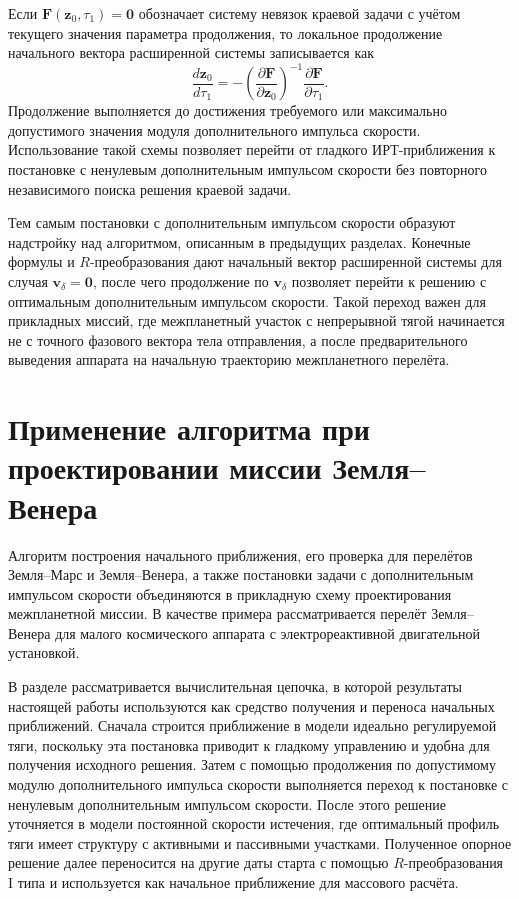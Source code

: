 Если \(\mathbf F(\mathbf z_0,\tau_1)=\mathbf 0\) обозначает систему невязок краевой задачи с учётом текущего значения параметра продолжения, то локальное продолжение начального вектора расширенной системы записывается как
\begin{equation}
	\frac{d\mathbf z_0}{d\tau_1}
	=
	-
	\left(
	\frac{\partial \mathbf F}{\partial \mathbf z_0}
	\right)^{-1}
	\frac{\partial \mathbf F}{\partial \tau_1}.
	\label{eq:ch4_vdelta_continuation_z0}
\end{equation}
Продолжение выполняется до достижения требуемого или максимально допустимого значения модуля дополнительного импульса скорости. Использование такой схемы позволяет перейти от гладкого ИРТ-приближения к постановке с ненулевым дополнительным импульсом скорости без повторного независимого поиска решения краевой задачи.

Тем самым постановки с дополнительным импульсом скорости образуют надстройку над алгоритмом, описанным в предыдущих разделах. Конечные формулы и \(R\)-преобразования дают начальный вектор расширенной системы для случая \(\mathbf v_\delta=\mathbf 0\), после чего продолжение по \(\mathbf v_\delta\) позволяет перейти к решению с оптимальным дополнительным импульсом скорости. Такой переход важен для прикладных миссий, где межпланетный участок с непрерывной тягой начинается не с точного фазового вектора тела отправления, а после предварительного выведения аппарата на начальную траекторию межпланетного перелёта.

\section{Применение алгоритма при проектировании миссии Земля--Венера}
\label{sec:ch4_venus_mission_application}

Алгоритм построения начального приближения, его проверка для перелётов Земля--Марс и Земля--Венера, а также постановки задачи с дополнительным импульсом скорости объединяются в прикладную схему проектирования межпланетной миссии. В качестве примера рассматривается перелёт Земля--Венера для малого космического аппарата с электрореактивной двигательной установкой.

В разделе рассматривается вычислительная цепочка, в которой результаты настоящей работы используются как средство получения и переноса начальных приближений. Сначала строится приближение в модели идеально регулируемой тяги, поскольку эта постановка приводит к гладкому управлению и удобна для получения исходного решения. Затем с помощью продолжения по допустимому модулю дополнительного импульса скорости выполняется переход к постановке с ненулевым дополнительным импульсом скорости. После этого решение уточняется в модели постоянной скорости истечения, где оптимальный профиль тяги имеет структуру с активными и пассивными участками. Полученное опорное решение далее переносится на другие даты старта с помощью \(R\)-преобразования I типа и используется как начальное приближение для массового расчёта.

